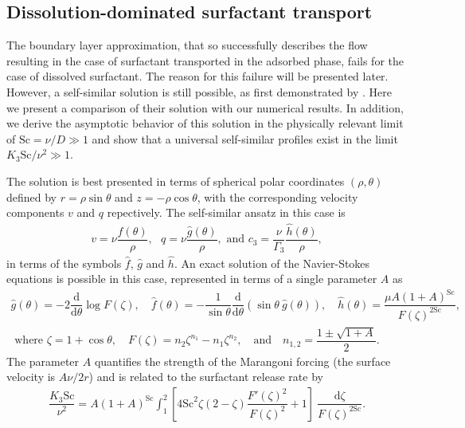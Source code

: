 \documentclass[]{jfm}
\newcommand{\Sc}{\text{Sc}}
\begin{document}
\subsection{Dissolution-dominated surfactant transport}
\label{sec:solsim}

The boundary layer approximation, that so successfully describes the flow resulting in the case of surfactant transported in the adsorbed phase, fails for the case of dissolved surfactant.
The reason for this failure will be presented later.
However, a self-similar solution is still possible, as first demonstrated by \cite{Bratukhin1967}.
Here we present a comparison of their solution with our numerical results. 
In addition, we derive the asymptotic behavior of this solution in the physically relevant limit of $\Sc = \nu/D\gg 1$ and show that a universal self-similar profiles exist in the limit $K_3 \Sc/\nu^2 \gg 1$.

The solution is best presented in terms of spherical polar coordinates $(\rho, \theta)$ defined by $r = \rho \sin \theta$ and $z=-\rho \cos\theta$, with the corresponding velocity components $v$ and $q$ repectively. 
The self-similar ansatz in this case is
\begin{align}
 v = \nu \dfrac{\hat{f}(\theta)}{\rho}, \text{ } q = \nu \dfrac{\hat{g}(\theta)}{\rho}, \text{ and } c_3 = \dfrac{\nu}{\Gamma_3} \dfrac{\hat{h}(\theta)}{\rho},
\end{align}
in terms of the symbols $\hat{f}$, $\hat{g}$ and $\hat{h}$.
An exact solution of the Navier-Stokes equations is possible in this case, represented in terms of a single parameter $A$ as
\begin{subequations}
\begin{align}
 \hat{g}(\theta) = -2 \dfrac{\text{d}}{\text{d} \theta} \log F(\zeta), \quad \hat{f}(\theta) = - \dfrac{1}{\sin\theta} \dfrac{\text{d}}{\text{d}\theta} (\sin\theta ~ \hat{g}(\theta)), \quad \hat{h}(\theta) = \dfrac{\mu A (1+A)^\Sc}{F(\zeta)^{2\Sc}}, \label{eqn:bratukhinsimilarity} \\
 \text{ where }\zeta=1+\cos\theta, \quad  F(\zeta) = n_2 \zeta^{n_1} - n_1 \zeta^{n_2}, \quad \text{and} \quad n_{1,2} = \dfrac{1 \pm \sqrt{1+A}}{2}.
\end{align}
\end{subequations}
The parameter $A$ quantifies the strength of the Marangoni forcing (the surface velocity is $A\nu/2r$) and is related to the surfactant release rate by
\begin{align}
 \dfrac{K_3 \Sc}{\nu^2} = A (1+A)^{\Sc} \int_1^2 \left[ 4 \Sc^2 \zeta (2-\zeta) \dfrac{F'(\zeta)^2}{F(\zeta)^2} + 1 \right]~ \dfrac{\text{d} \zeta}{F(\zeta)^{2\Sc}}.
 \label{eqn:A}
\end{align}
\end{document}
